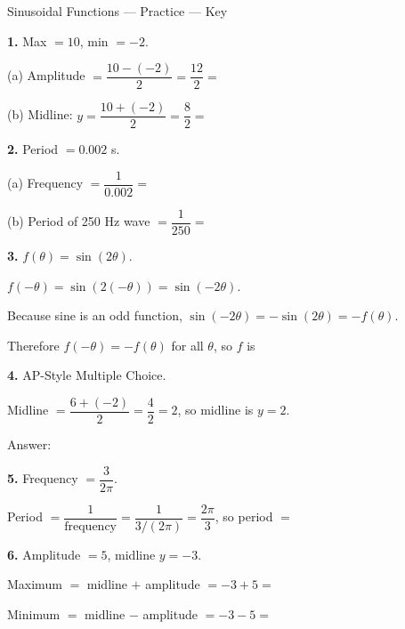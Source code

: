 \documentclass[10pt]{article}
\begin{document}
\namedateperiod

\vspace{0.12in}

\begin{notesbox}{Sinusoidal Functions --- Practice --- Key}

\textbf{1.} Max $= 10$, min $= -2$.

\medskip
(a) Amplitude $= \dfrac{10 - (-2)}{2} = \dfrac{12}{2} = $ 

\medskip
(b) Midline: $y = \dfrac{10 + (-2)}{2} = \dfrac{8}{2} = $ 

\vspace{0.1in}

\textbf{2.} Period $= 0.002$ s.

\medskip
(a) Frequency $= \dfrac{1}{0.002} = $ 

\medskip
(b) Period of 250 Hz wave $= \dfrac{1}{250} = $ 

\vspace{0.1in}

\textbf{3.} $f(\theta) = \sin(2\theta)$.

\medskip
$f(-\theta) = \sin(2(-\theta)) = \sin(-2\theta)$.

Because sine is an odd function, $\sin(-2\theta) = -\sin(2\theta) = -f(\theta)$.

Therefore $f(-\theta) = -f(\theta)$ for all $\theta$, so $f$ is 

\vspace{0.1in}

\textbf{4.} AP-Style Multiple Choice.

Midline $= \dfrac{6 + (-2)}{2} = \dfrac{4}{2} = 2$, so midline is $y = 2$.

Answer: 

\vspace{0.1in}

\textbf{5.} Frequency $= \dfrac{3}{2\pi}$.

Period $= \dfrac{1}{\text{frequency}} = \dfrac{1}{3/(2\pi)} = \dfrac{2\pi}{3}$,
so period $= $ 

\vspace{0.1in}

\textbf{6.} Amplitude $= 5$, midline $y = -3$.

Maximum $= $ midline $+$ amplitude $= -3 + 5 = $ 

Minimum $= $ midline $-$ amplitude $= -3 - 5 = $ 

\end{notesbox}
\end{document}
